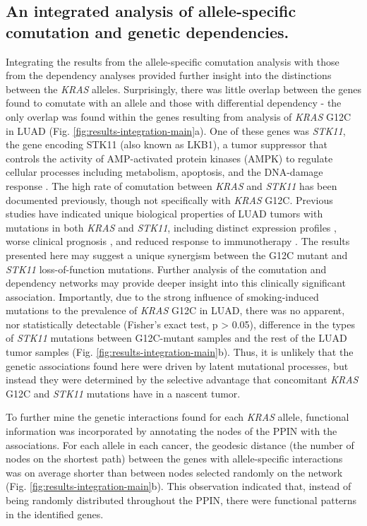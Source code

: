 \documentclass[english, 10pt, letterpaper]{article}
\newcommand{\KRAS}{\emph{KRAS}}
\begin{document}
\subsection*{An integrated analysis of allele-specific comutation and genetic dependencies.}

Integrating the results from the allele-specific comutation analysis with those from the dependency analyses provided further insight into the distinctions between the \KRAS{} alleles.
Surprisingly, there was little overlap between the genes found to comutate with an allele and those with differential dependency - the only overlap was found within the genes resulting from analysis of \KRAS{} G12C in LUAD (Fig. \ref{fig:results-integration-main}a).
One of these genes was \emph{STK11}, the gene encoding STK11 (also known as LKB1), a tumor suppressor that controls the activity of AMP-activated protein kinases (AMPK) to regulate cellular processes including metabolism, apoptosis, and the DNA-damage response \cite{Momcilovic2015TargetingVulnerabilities., Korsse2013TargetingCancer.}.
The high rate of comutation between \KRAS{} and \emph{STK11} has been documented previously, though not specifically with \KRAS{} G12C.
Previous studies have indicated unique biological properties of LUAD tumors with mutations in both \KRAS{} and \emph{STK11}, including distinct expression profiles \cite{Skoulidis2015Co-occurringVulnerabilities.}, worse clinical prognosis \cite{LaFleur2019MutationSTK11, Bange2019ImpactCancer.}, and reduced response to immunotherapy \cite{Skoulidis2018STK11/LKB1Adenocarcinoma.}.
The results presented here may suggest a unique synergism between the G12C mutant and \emph{STK11} loss-of-function mutations.
Further analysis of the comutation and dependency networks may provide deeper insight into this clinically significant association.
Importantly, due to the strong influence of smoking-induced mutations to the prevalence of \KRAS{} G12C in LUAD, there was no apparent, nor statistically detectable (Fisher's exact test, p > 0.05), difference in the types of \emph{STK11} mutations between G12C-mutant samples and the rest of the LUAD tumor samples (Fig. \ref{fig:results-integration-main}b).
Thus, it is unlikely that the genetic associations found here were driven by latent mutational processes, but instead they were determined by the selective advantage that concomitant \KRAS{} G12C and \emph{STK11} mutations have in a nascent tumor.

To further mine the genetic interactions found for each \KRAS{} allele, functional information was incorporated by annotating the nodes of the PPIN with the associations.
For each allele in each cancer, the geodesic distance (the number of nodes on the shortest path) between the genes with allele-specific interactions was on average shorter than between nodes selected randomly on the network (Fig. \ref{fig:results-integration-main}b).
This observation indicated that, instead of being randomly distributed throughout the PPIN, there were functional patterns in the identified genes.
\end{document}
